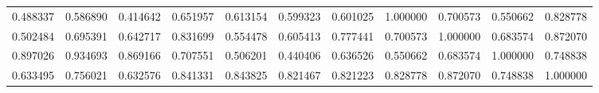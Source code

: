 \begin{table}
\begin{tabular}{lcr}
0.488337 & 0.586890 & 0.414642 & 0.651957 & 0.613154 & 0.599323 & 0.601025 & 1.000000 & 0.700573 & 0.550662 & 0.828778 \\
0.502484 & 0.695391 & 0.642717 & 0.831699 & 0.554478 & 0.605413 & 0.777441 & 0.700573 & 1.000000 & 0.683574 & 0.872070 \\
0.897026 & 0.934693 & 0.869166 & 0.707551 & 0.506201 & 0.440406 & 0.636526 & 0.550662 & 0.683574 & 1.000000 & 0.748838 \\
0.633495 & 0.756021 & 0.632576 & 0.841331 & 0.843825 & 0.821467 & 0.821223 & 0.828778 & 0.872070 & 0.748838 & 1.000000 \\
\bottomrule
\end{tabular}
\end{table}
